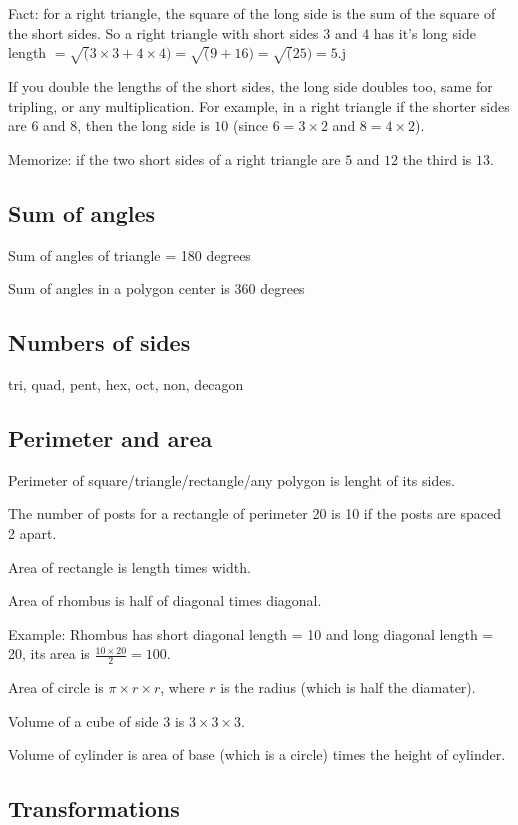 \documentclass[fullpage,twocolumn]{article}
\begin{document}
Fact: for a right triangle, the square of the long side is the sum of the square of
the short sides. So a right triangle with short sides $3$ and $4$ has it's long
side length $ = \sqrt(3 \times 3 + 4 \times 4) = \sqrt(9 + 16) = \sqrt(25) = 5$.j

If you double the lengths of the short sides, the long side doubles too, same
for tripling, or any multiplication. For example, 
in a right triangle if the shorter sides are $6$ and $8$, then the long side
is $10$ (since $6 = 3 \times 2$ and $8 = 4 \times 2$).

Memorize: if the two short sides of a right triangle are $5$ and $12$ the third is
$13$.

\subsection{Sum of angles}
Sum of angles of triangle = 180 degrees 

Sum of angles in a polygon center is 360 degrees

\subsection{Numbers of sides}

tri, quad, pent, hex, oct, non, decagon

\subsection{Perimeter and area}

Perimeter of square/triangle/rectangle/any polygon is lenght of its sides.

The number of posts for a rectangle of perimeter
20 is 10 if the posts are spaced 2 apart.

Area of rectangle is length times width.

Area of rhombus is half of diagonal times diagonal.

Example: Rhombus has short diagonal length = 10 and long diagonal length = 20,
its area is $\frac{10 \times 20}{2} = 100$.

Area of circle is $\pi \times r \times r$, where $r$ is the radius (which is half the diamater).

Volume of a cube of side 3 is $3 \times 3 \times 3$.

Volume of cylinder is area of base (which is a circle) times the
height of cylinder.

\subsection{Transformations}
\end{document}
